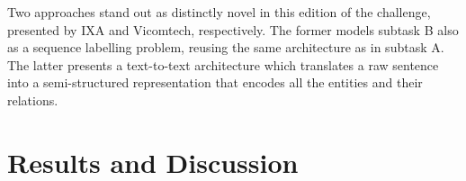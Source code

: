 \documentclass[a4paper,11pt,twocolumn,twoside]{article}
\begin{document}
Two approaches stand out as distinctly novel in this edition of the challenge, presented by IXA and Vicomtech, respectively.
The former models subtask B also as a sequence labelling problem, reusing the same architecture as in subtask A.
The latter presents a text-to-text architecture which translates a raw sentence into a semi-structured representation that encodes all the entities and their relations.

\section{Results and Discussion}\label{sec:results}

\begin{table}
    \caption{Summary of results in the three evaluation scenarios of the eHealth-KD Challenge. The top result in every metric is highlighted. For comparative purpose, an estimated \textit{human} performance~(based on inter-annotator agreement) and a simple computational \textit{baseline} are also reported.\label{tab:results}}
  \end{table}
\end{document}
